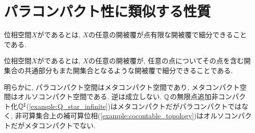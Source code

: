\documentclass[uplatex, dvipdfmx, a4paper, 12pt, class=jsbook, crop=false]{standalone}
\begin{document}
\section{パラコンパクト性に類似する性質}
\label{sec:paracompact-like-properties}

\begin{definition}
	位相空間$ X $がであるとは, $ X $の任意の開被覆が点有限な開被覆で細分できることである.
\end{definition}

\begin{definition}
	位相空間$ X $がであるとは, $ X $の任意の開被覆が, 任意の点についてその点を含む開集合の共通部分もまた開集合となるような開被覆で細分できることである.
\end{definition}

明らかに, パラコンパクト空間はメタコンパクト空間であり, メタコンパクト空間はオルソコンパクト空間である. 逆は成立しない. $ \mathbb{Q} $の無限点追加非コンパクト化$ \mathbb{Q}^\sharp $(\ref{example:Q_star_infinite})はメタコンパクトだがパラコンパクトではなく, 非可算集合上の補可算位相(\ref{example:cocontable_topology})はオルソコンパクトだがメタコンパクトでない.
\end{document}
